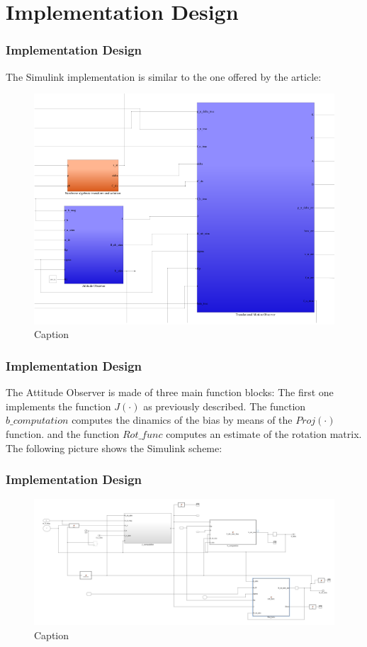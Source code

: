 \documentclass{beamer}
\begin{document}
	
\section{Implementation Design}
	\begin{frame}
		\frametitle{Implementation Design}
		The Simulink implementation is similar to the one offered by the article:
		\begin{figure}
		    \centering
		    \includegraphics[scale = 0.31]{scheme}
		    \caption{Caption}
		    \label{fig:my_label}
		\end{figure}
	\end{frame}
	\begin{frame}
		\frametitle{Implementation Design}
		The Attitude Observer is made of three main function blocks:
		The first one implements the function $J(\cdot) $ as previously described. 
		The function $b\_computation$ computes the dinamics of the bias by means of the $Proj(\cdot)$ function. and the function $Rot\_func$ computes an estimate of the rotation matrix. 
		The following picture shows the Simulink scheme:
	\end{frame}
	\begin{frame}
		\frametitle{Implementation Design}
		\begin{figure}
		    \centering
		    \includegraphics[scale=0.25]{at}
		    \caption{Caption}
		    \label{fig:my_label2}
		\end{figure}
	\end{frame}
\end{document}
